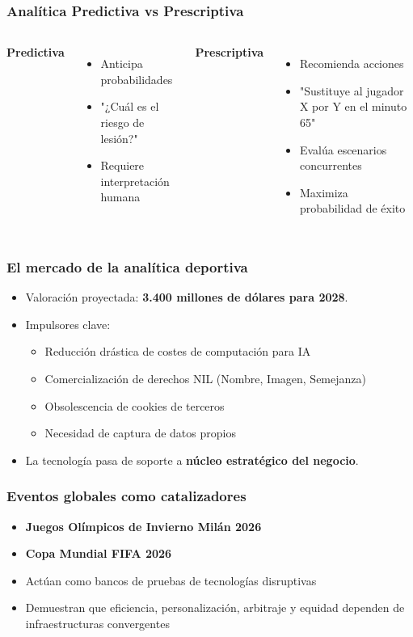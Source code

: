 \documentclass[aspectratio=169]{beamer}
\begin{document}
\begin{frame}\frametitle{Analítica Predictiva vs Prescriptiva}
\begin{columns}[T]
\textbf{Predictiva}
\begin{itemize}
    \item Anticipa probabilidades
    \item "¿Cuál es el riesgo de lesión?"
    \item Requiere interpretación humana
\end{itemize}

\textbf{Prescriptiva}
\begin{itemize}
    \item Recomienda acciones
    \item "Sustituye al jugador X por Y en el minuto 65"
    \item Evalúa escenarios concurrentes
    \item Maximiza probabilidad de éxito
\end{itemize}
\end{columns}
\end{frame}

\begin{frame}\frametitle{El mercado de la analítica deportiva}
\begin{itemize}
    \item Valoración proyectada: \textbf{3.400 millones de dólares para 2028}.
    \item Impulsores clave:
    \begin{itemize}
        \item Reducción drástica de costes de computación para IA
        \item Comercialización de derechos NIL (Nombre, Imagen, Semejanza)
        \item Obsolescencia de cookies de terceros
        \item Necesidad de captura de datos propios
    \end{itemize}
    \item La tecnología pasa de soporte a \textbf{núcleo estratégico del negocio}.
\end{itemize}
\end{frame}

\begin{frame}\frametitle{Eventos globales como catalizadores}
\begin{itemize}
    \item \textbf{Juegos Olímpicos de Invierno Milán 2026}
    \item \textbf{Copa Mundial FIFA 2026}
    \item Actúan como bancos de pruebas de tecnologías disruptivas
    \item Demuestran que eficiencia, personalización, arbitraje y equidad dependen de infraestructuras convergentes
\end{itemize}
\end{frame}
\end{document}
